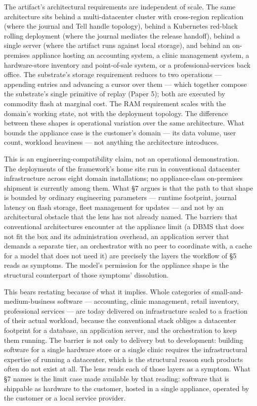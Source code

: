\documentclass[
]{article}
\begin{document}
The artifact's architectural requirements are independent of scale. The
same architecture sits behind a multi-datacenter cluster with
cross-region replication (where the journal and Tell handle topology),
behind a Kubernetes red-black rolling deployment (where the journal
mediates the release handoff), behind a single server (where the
artifact runs against local storage), and behind an on-premises
appliance hosting an accounting system, a clinic management system, a
hardware-store inventory and point-of-sale system, or a
professional-services back office. The substrate's storage requirement
reduces to two operations --- appending entries and advancing a cursor
over them --- which together compose the substrate's single primitive of
replay (Paper 5); both are executed by commodity flash at marginal cost.
The RAM requirement scales with the domain's working state, not with the
deployment topology. The difference between these shapes is operational
variation over the same architecture. What bounds the appliance case is
the customer's domain --- its data volume, user count, workload
heaviness --- not anything the architecture introduces.

This is an engineering-compatibility claim, not an operational
demonstration. The deployments of the framework's home site run in
conventional datacenter infrastructure across eight domain
installations; no appliance-class on-premises shipment is currently
among them. What §7 argues is that the path to that shape is bounded by
ordinary engineering parameters --- runtime footprint, journal latency
on flash storage, fleet management for updates --- and not by an
architectural obstacle that the lens has not already named. The barriers
that conventional architectures encounter at the appliance limit (a DBMS
that does not fit the box and its administration overhead, an
application server that demands a separate tier, an orchestrator with no
peer to coordinate with, a cache for a model that does not need it) are
precisely the layers the workflow of §5 reads as symptoms. The model's
permission for the appliance shape is the structural counterpart of
those symptoms' dissolution.

This bears restating because of what it implies. Whole categories of
small-and-medium-business software --- accounting, clinic management,
retail inventory, professional services --- are today delivered on
infrastructure scaled to a fraction of their actual workload, because
the conventional stack obliges a datacenter footprint for a database, an
application server, and the orchestration to keep them running. The
barrier is not only to delivery but to development: building software
for a single hardware store or a single clinic requires the
infrastructural expertise of running a datacenter, which is the
structural reason such products often do not exist at all. The lens
reads each of those layers as a symptom. What §7 names is the limit case
made available by that reading: software that is shippable as hardware
to the customer, hosted in a single appliance, operated by the customer
or a local service provider.
\end{document}
